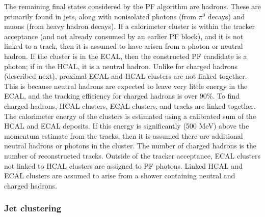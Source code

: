 The remaining final states considered by the PF algorithm are hadrons.
These are primarily found in jets, along with nonisolated photons (from $\pi^0$ decays) and muons (from heavy hadron decays).
If a calorimeter cluster is within the tracker acceptance (and not already consumed by an earlier PF block), and it is not linked to a track, then it is assumed to have arisen from a photon or neutral hadron.
If the cluster is in the ECAL, then the constructed PF candidate is a photon; if in the HCAL, it is a neutral hadron.
Unlike for charged hadrons (described next), proximal ECAL and HCAL clusters are not linked together.
This is because neutral hadrons are expected to leave very little energy in the ECAL, and the tracking efficiency for charged hadrons is over 90\%.
To find charged hadrons, HCAL clusters, ECAL clusters, and tracks are linked together.
The calorimeter energy of the clusters is estimated using a calibrated sum of the HCAL and ECAL deposits.
If this energy is significantly (500 MeV) above the momentum estimate from the tracks, then it is assumed there are additional neutral hadrons or photons in the cluster.
The number of charged hadrons is the number of reconstructed tracks.
Outside of the tracker acceptance, ECAL clusters not linked to HCAL clusters are assigned to PF photons.
Linked HCAL and ECAL clusters are assumed to arise from a shower containing neutral and charged hadrons.

\subsubsection{Jet clustering}

